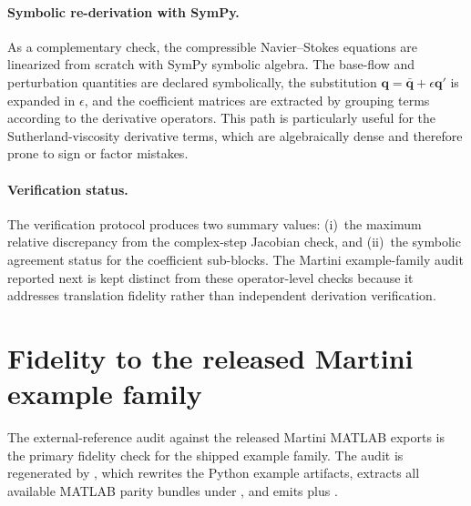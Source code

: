\documentclass[11pt]{article}
\newcommand{\bq}{\mathbf{q}}
\newcommand{\bqp}{\mathbf{q}'}
\newcommand{\bqbar}{\bar{\mathbf{q}}}
\begin{document}
\paragraph{Symbolic re-derivation with SymPy.}
As a complementary check, the compressible Navier--Stokes equations are
linearized from scratch with SymPy symbolic algebra. The base-flow and
perturbation quantities are declared symbolically, the substitution
$\bq = \bqbar + \epsilon \bqp$ is expanded in $\epsilon$, and the coefficient
matrices are extracted by grouping terms according to the derivative operators.
This path is particularly useful for the Sutherland-viscosity derivative terms,
which are algebraically dense and therefore prone to sign or factor mistakes.

\paragraph{Verification status.}
The verification protocol produces two summary values:
(i)~the maximum relative discrepancy from the complex-step Jacobian check, and
(ii)~the symbolic agreement status for the coefficient sub-blocks. The Martini
example-family audit reported next is kept distinct from these operator-level
checks because it addresses translation fidelity rather than independent
derivation verification.

\section{Fidelity to the released Martini example family}
\label{sec:martini_fidelity}

The external-reference audit against the released Martini MATLAB exports is the
primary fidelity check for the shipped example family. The audit is regenerated
by , which rewrites the Python example artifacts,
extracts all available MATLAB parity bundles under ,
and emits  plus
.
\end{document}
